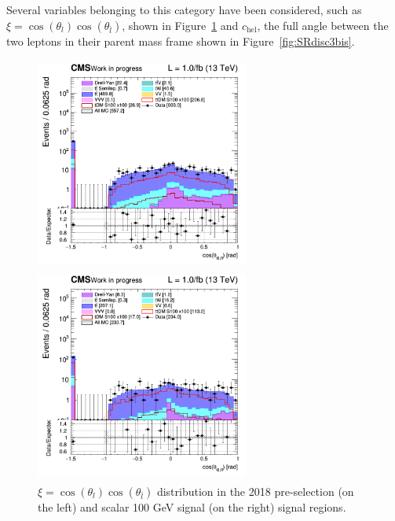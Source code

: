 \documentclass[a4paper, 10pt, openright]{report}
\begin{document}
\begin{itemize}
Several variables belonging to this category have been considered, such as $\xi = \cos(\theta_l) \cos(\theta_{\bar l})$, shown in Figure~\ref{fig:SRdisc3} and $c_{\text{hel}}$, the full angle between the two leptons in their parent mass frame shown in Figure~\ref{fig:SRdisc3bis}.

\begin{figure}[htbp]
\centering
\begin{minipage}[b]{.48\textwidth}
\includegraphics[width=7cm, height=7cm]{figs/2018/SRBlinded-ttDM-scalar100/log_cratio_topCR_ll_costhetall.png}
\end{minipage}\hfill
\begin{minipage}[b]{.48\textwidth}
\includegraphics[width=7cm, height=7cm]{figs/2018/SRBlinded-ttDM-scalar100/log_cratio_topCR_ll_BDT_ttDM100_costhetall.png}
\end{minipage} \hfill
\caption{$\xi = \cos(\theta_l) \cos(\theta_{\bar l})$ distribution in the 2018 pre-selection (on the left) and scalar 100 GeV signal (on the right) signal regions.}
\label{fig:SRdisc3}
\end{figure}


\end{itemize}
\end{document}
